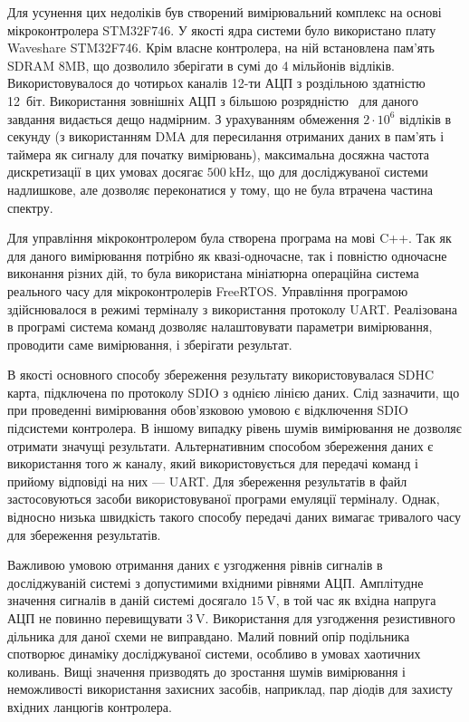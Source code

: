 Для усунення цих недоліків був створений вимірювальний
комплекс на основі мікроконтролера STM32F746. У якості ядра системи було використано
плату Waveshare STM32F746. Крім власне контролера, на ній
встановлена пам'ять SDRAM 8MB, що дозволило зберігати
в сумі до 4 мільйонів відліків. Використовувалося до чотирьох
каналів 12-ти АЦП з роздільною здатністю 12~біт. Використання
зовнішніх АЦП з більшою розрядністю~\cite{atu_st104a} для даного
завдання видається дещо надмірним. З урахуванням обмеження
$ 2 \cdot 10 ^ 6 $ відліків в секунду (з використанням DMA для пересилання
отриманих даних в пам'ять і таймера як сигналу для початку
вимірювань), максимальна досяжна частота дискретизації в цих
умовах досягає
$ \SI{500}{\kilo \hertz} $, що для досліджуваної системи надлишкове,
але дозволяє переконатися у тому, що не була втрачена частина
спектру.

Для управління мікроконтролером була створена програма на
мові C++. Так як для даного вимірювання потрібно як квазі-одночасне,
так і повністю одночасне виконання різних дій, то була
використана мініатюрна операційна система реального часу для
мікроконтролерів FreeRTOS. Управління програмою здійснювалося
в режимі терміналу з використання протоколу UART. Реалізована
в програмі система команд дозволяє налаштовувати параметри
вимірювання, проводити саме вимірювання, і зберігати результат.

В якості основного способу збереження результату
використовувалася SDHC карта, підключена по протоколу SDIO з однією
лінією даних. Слід зазначити, що при проведенні вимірювання
обов'язковою умовою є відключення SDIO підсистеми контролера. В
іншому випадку рівень шумів вимірювання не дозволяє отримати
значущі результати. Альтернативним способом збереження
даних є використання того ж каналу, який використовується для
передачі команд і прийому відповіді на них --- UART. Для збереження
результатів в файл застосовуються засоби використовуваної
програми емуляції терміналу. Однак, відносно низька швидкість
такого способу передачі даних вимагає тривалого часу для
збереження результатів.

Важливою умовою отримання даних є узгодження рівнів сигналів
в досліджуваній системі з допустимими вхідними рівнями
АЦП. Амплітудне значення сигналів в даній системі досягало
$ \SI{15}{\volt} $, в той час як вхідна напруга АЦП не повинно
перевищувати
$ \SI{3}{\volt} $. Використання для узгодження резистивного дільника
для даної схеми не виправдано. Малий повний опір подільника
спотворює динаміку досліджуваної системи, особливо в умовах
хаотичних коливань. Вищі значення призводять до зростання шумів
вимірювання і неможливості використання захисних засобів,
наприклад, пар діодів для захисту вхідних ланцюгів контролера.


